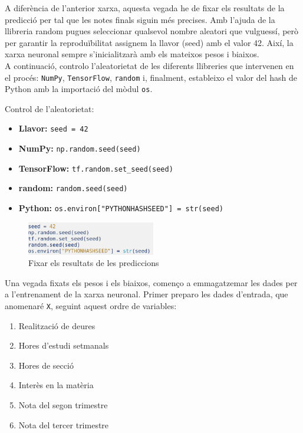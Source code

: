 A diferència de l’anterior xarxa, aquesta vegada he de fixar els resultats de la predicció per tal que les notes finals siguin més precises. Amb l’ajuda de la llibreria random pugues seleccionar qualsevol nombre aleatori que vulguessí, però per garantir la reproduïbilitat assignem la llavor (seed) amb el valor 42. Així, la xarxa neuronal sempre s’inicialitzarà amb els mateixos pesos i biaixos.\\

A continuació, controlo l’aleatorietat de les diferents llibreries que intervenen en el procés: \texttt{NumPy}, \texttt{TensorFlow}, \texttt{random} i, finalment, estableixo el valor del hash de Python amb la importació del mòdul \texttt{os}.

Control de l’aleatorietat:
\begin{itemize}
\item \textbf{Llavor:} \texttt{seed = 42}
\item \textbf{NumPy:} \texttt{np.random.seed(seed)}
\item \textbf{TensorFlow:} \texttt{tf.random.set\_seed(seed)}
\item \textbf{random:} \texttt{random.seed(seed)}
\item \textbf{Python:} \texttt{os.environ["PYTHONHASHSEED"] = str(seed)}
\end{itemize}

\begin{figure}[H]
    \centering
    \includegraphics[width=0.5\textwidth]{./figures/22.png}
    \caption{Fixar els resultats de les prediccions}
\end{figure}


Una vegada fixats els pesos i els biaixos, començo a emmagatzemar les dades per a l’entrenament de la xarxa neuronal.
Primer preparo les dades d’entrada, que anomenaré \texttt{X}, seguint aquest ordre de variables:

\begin{enumerate}
    \item Realització de deures
    \item Hores d’estudi setmanals
    \item Hores de secció
    \item Interès en la matèria
    \item Nota del segon trimestre
    \item Nota del tercer trimestre
\end{enumerate}

